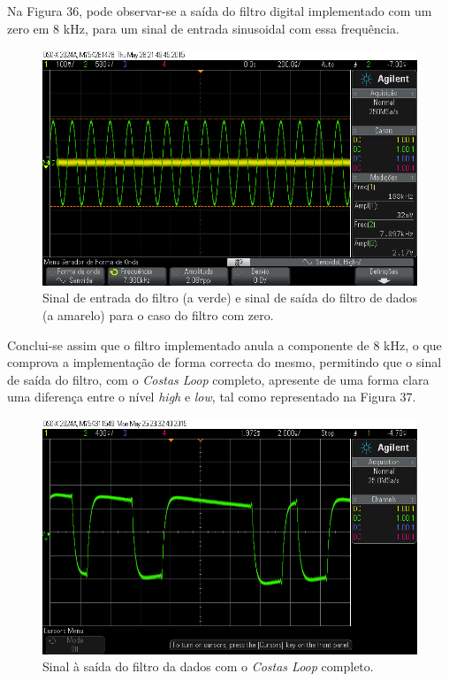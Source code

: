 \documentclass[11pt]{article}
\numberwithin{equation}{section}
\begin{document}
Na Figura 36, pode observar-se a saída do filtro digital implementado com um zero em 8 kHz, para um sinal de entrada sinusoidal com essa frequência. 

\begin{figure}[H]
	\centering
	\includegraphics[keepaspectratio=true, scale=0.37]{exps/FiltroComZero8k}
	\caption{Sinal de entrada do filtro (a verde) e sinal de saída do filtro de dados (a amarelo) para o caso do filtro com zero.}
	\vspace{-0.8em}
\end{figure} 

Conclui-se assim que o filtro implementado anula a componente de 8 kHz, o que comprova a implementação de forma correcta do mesmo, permitindo que o sinal de saída do filtro, com o \textit{Costas Loop} completo, apresente de uma forma clara uma diferença entre o nível \textit{high} e \textit{low}, tal como representado na Figura 37.

\begin{figure}[H]
	\centering
	\includegraphics[keepaspectratio=true, scale=0.37]{exps/pulse_saida_filtro_Sine_mudancanoFiltro}
	\caption{Sinal à saída do filtro da dados com o \textit{Costas Loop} completo.}
	\vspace{-0.8em}
\end{figure}
\end{document}
